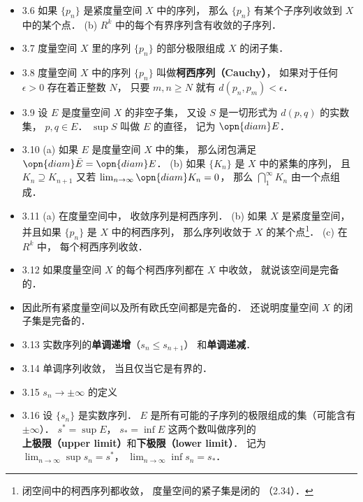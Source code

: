 \begin{itemize}
\item 3.6 如果 $\{p_n\}$ 是紧度量空间 $X$ 中的序列， 那么 $\{p_n\}$ 有某个子序列收敛到 $X$ 中的某个点． (b) $R^k$ 中的每个有界序列含有收敛的子序列．

\item 3.7 度量空间 $X$ 里的序列 $\{p_n\}$ 的部分极限组成 $X$ 的闭子集．

\item 3.8 度量空间 $X$ 中的序列 $\{p_n\}$ 叫做\textbf{柯西序列（Cauchy）}， 如果对于任何 $\epsilon>0$ 存在着正整数 $N$， 只要 $m,n\geqslant N$ 就有 $d(p_n, p_m)<\epsilon$．

\item 3.9 设 $E$ 是度量空间 $X$ 的非空子集， 又设 $S$ 是一切形式为 $d(p,q)$ 的实数集， $p,q\in E$． $\sup S$ 叫做 $E$ 的直径， 记为 $\opn{diam} E$．

\item 3.10 (a) 如果 $E$ 是度量空间 $X$ 中的集， 那么闭包满足 $\opn{diam}\bar E = \opn{diam} E$． (b) 如果 $\{K_n\}$ 是 $X$ 中的紧集的序列， 且 $K_n \supseteq K_{n+1}$ 又若 $\lim_{n\to\infty} \opn{diam} K_n = 0$， 那么 $\bigcap_1^\infty K_n$ 由一个点组成．

\item 3.11 (a) 在度量空间中， 收敛序列是柯西序列． (b) 如果 $X$ 是紧度量空间， 并且如果 $\{p_n\}$ 是 $X$ 中的柯西序列， 那么序列收敛于 $X$ 的某个点\footnote{闭空间中的柯西序列都收敛， 度量空间的紧子集是闭的 （2.34）．}． (c) 在 $R^k$ 中， 每个柯西序列收敛．

\item 3.12 如果度量空间 $X$ 的每个柯西序列都在 $X$ 中收敛， 就说该空间是完备的．

\item 因此所有紧度量空间以及所有欧氏空间都是完备的． 还说明度量空间 $X$ 的闭子集是完备的．

\item 3.13 实数序列的\textbf{单调递增}（$s_n\leqslant s_{n+1}$） 和\textbf{单调递减}．

\item 3.14 单调序列收敛， 当且仅当它是有界的．

\item 3.15 $s_n\to \pm \infty$ 的定义

\item 3.16 设 $\{s_n\}$ 是实数序列． $E$ 是所有可能的子序列的极限组成的集（可能含有 $\pm\infty$）． $s^* = \sup E$， $s_* = \inf E$ 这两个数叫做序列的\textbf{上极限（upper limit）}和\textbf{下极限（lower limit）}． 记为 $\lim_{n\to\infty} \sup s_n = s^*$， $\lim_{n\to\infty} \inf s_n = s_*$．


\end{itemize}
